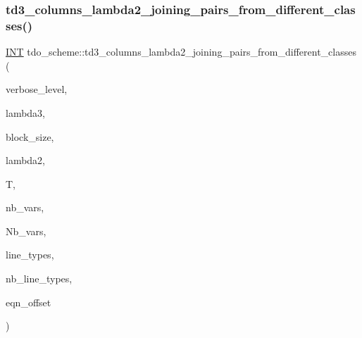 \subsubsection{\texorpdfstring{td3\+\_\+columns\+\_\+lambda2\+\_\+joining\+\_\+pairs\+\_\+from\+\_\+different\+\_\+classes()}{td3\_columns\_lambda2\_joining\_pairs\_from\_different\_classes()}}
{\footnotesize\ttfamily \mbox{\hyperlink{galois_8h_a09fddde158a3a20bd2dcadb609de11dc}{I\+NT}} tdo\+\_\+scheme\+::td3\+\_\+columns\+\_\+lambda2\+\_\+joining\+\_\+pairs\+\_\+from\+\_\+different\+\_\+classes (\begin{DoxyParamCaption}\item[{\mbox{\hyperlink{galois_8h_a09fddde158a3a20bd2dcadb609de11dc}{I\+NT}}}]{verbose\+\_\+level,  }\item[{\mbox{\hyperlink{galois_8h_a09fddde158a3a20bd2dcadb609de11dc}{I\+NT}}}]{lambda3,  }\item[{\mbox{\hyperlink{galois_8h_a09fddde158a3a20bd2dcadb609de11dc}{I\+NT}}}]{block\+\_\+size,  }\item[{\mbox{\hyperlink{galois_8h_a09fddde158a3a20bd2dcadb609de11dc}{I\+NT}}}]{lambda2,  }\item[{\mbox{\hyperlink{classtdo__data}{tdo\+\_\+data}} \&}]{T,  }\item[{\mbox{\hyperlink{galois_8h_a09fddde158a3a20bd2dcadb609de11dc}{I\+NT}}}]{nb\+\_\+vars,  }\item[{\mbox{\hyperlink{galois_8h_a09fddde158a3a20bd2dcadb609de11dc}{I\+NT}}}]{Nb\+\_\+vars,  }\item[{\mbox{\hyperlink{galois_8h_a09fddde158a3a20bd2dcadb609de11dc}{I\+NT}} $\ast$\&}]{line\+\_\+types,  }\item[{\mbox{\hyperlink{galois_8h_a09fddde158a3a20bd2dcadb609de11dc}{I\+NT}} \&}]{nb\+\_\+line\+\_\+types,  }\item[{\mbox{\hyperlink{galois_8h_a09fddde158a3a20bd2dcadb609de11dc}{I\+NT}}}]{eqn\+\_\+offset }\end{DoxyParamCaption})}

\mbox{\label{classtdo__scheme_a50a6c755141f10e816c3c040f58de750}} 
